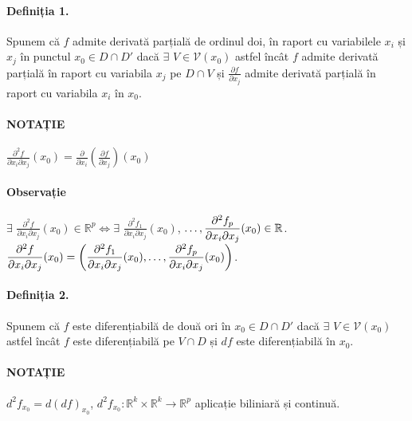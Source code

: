 \paragraph{Definiția 1.}
Spunem că $f$ admite derivată parțială de ordinul doi, în raport cu variabilele $x_{i}$ și $x_{j}$ în punctul $x_{0} \in D \cap D'$ dacă
$\exists$ $V \in \mathcal{V}(x_{0})$ astfel încât $f$ admite derivată parțială în raport cu variabila $x_{j}$ pe $D \cap V$ și
$\displaystyle\frac{\partial f}{\partial x_{j}}$ admite derivată parțială în raport cu variabila $x_{i}$ în $x_{0}$.

\paragraph{NOTAȚIE}
$\displaystyle\frac{\partial^{2} f}{\partial x_{i} \partial x_{j}}(x_{0}) = 
\displaystyle\frac{\partial}{\partial x_{i}}\left(\displaystyle\frac{\partial f}{\partial x_{j}}\right)(x_{0})$

\paragraph{Observație}
$\exists$ $\displaystyle\frac{\partial^{2} f}{\partial x_{i} \partial x_{j}}(x_{0}) \in \mathbb{R}^{p} \Leftrightarrow \exists$
$\displaystyle\frac{\partial^{2} f_{1}}{\partial x_{i} \partial x_{j}}(x_{0})$, $\mathellipsis, 
\displaystyle\frac{\partial^{2} f_{p}}{\partial x_{i} \partial x_{j}}(x_{0}) \in \mathbb{R}$. \\
$\displaystyle\frac{\partial^{2} f}{\partial x_{i} \partial x_{j}}(x_{0}) = 
\left(\displaystyle\frac{\partial^{2} f_{1}}{\partial x_{i} \partial x_{j}}(x_{0}) \text{,} \mathellipsis, 
\displaystyle\frac{\partial^{2} f_{p}}{\partial x_{i} \partial x_{j}}(x_{0}) \right)$.

\paragraph{Definiția 2.}
Spunem că $f$ este diferențiabilă de două ori în $x_{0} \in D \cap D'$ dacă $\exists$ $V \in \mathcal{V}(x_{0})$ astfel încât
$f$ este diferențiabilă pe $V \cap D$ și $df$ este diferențiabilă în $x_{0}$.

\paragraph{NOTAȚIE}
$d^{2}f_{x_{0}} = d(df)_{x_{0}}$, $d^{2}f_{x_{0}}: \mathbb{R}^{k} \times \mathbb{R}^{k} \rightarrow \mathbb{R}^{p}$ aplicație biliniară și continuă.

